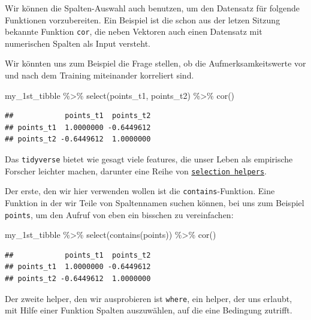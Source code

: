 \documentclass[
]{book}
\newenvironment{Shaded}{\begin{snugshade}}{\end{snugshade}}
\newcommand{\FunctionTok}[1]{\textcolor[rgb]{0.00,0.00,0.00}{#1}}
\newcommand{\NormalTok}[1]{#1}
\newcommand{\SpecialCharTok}[1]{\textcolor[rgb]{0.00,0.00,0.00}{#1}}
\newcommand{\StringTok}[1]{\textcolor[rgb]{0.31,0.60,0.02}{#1}}
\begin{document}
Wir können die Spalten-Auswahl auch benutzen, um den Datensatz für folgende Funktionen vorzubereiten. Ein Beispiel ist die schon aus der letzen Sitzung bekannte Funktion \texttt{cor}, die neben Vektoren auch einen Datensatz mit numerischen Spalten als Input versteht.

Wir könnten uns zum Beispiel die Frage stellen, ob die Aufmerksamkeitswerte vor und nach dem Training miteinander korreliert sind.

\begin{Shaded}
\begin{Highlighting}[]
\NormalTok{my\_1st\_tibble }\SpecialCharTok{\%\textgreater{}\%} 
  \FunctionTok{select}\NormalTok{(points\_t1, points\_t2) }\SpecialCharTok{\%\textgreater{}\%} 
  \FunctionTok{cor}\NormalTok{()}
\end{Highlighting}
\end{Shaded}

\begin{verbatim}
##            points_t1  points_t2
## points_t1  1.0000000 -0.6449612
## points_t2 -0.6449612  1.0000000
\end{verbatim}

Das \texttt{tidyverse} bietet wie gesagt viele features, die unser Leben als empirische Forscher leichter machen, darunter eine Reihe von \href{https://tidyselect.r-lib.org/reference/language.html}{\texttt{selection\ helpers}}.

Der erste, den wir hier verwenden wollen ist die \texttt{contains}-Funktion. Eine Funktion in der wir Teile von Spaltennamen suchen können, bei uns zum Beispiel \texttt{\textquotesingle{}points\textquotesingle{}}, um den Aufruf von eben ein bisschen zu vereinfachen:

\begin{Shaded}
\begin{Highlighting}[]
\NormalTok{my\_1st\_tibble }\SpecialCharTok{\%\textgreater{}\%} 
  \FunctionTok{select}\NormalTok{(}\FunctionTok{contains}\NormalTok{(}\StringTok{\textquotesingle{}points\textquotesingle{}}\NormalTok{)) }\SpecialCharTok{\%\textgreater{}\%} 
  \FunctionTok{cor}\NormalTok{()}
\end{Highlighting}
\end{Shaded}

\begin{verbatim}
##            points_t1  points_t2
## points_t1  1.0000000 -0.6449612
## points_t2 -0.6449612  1.0000000
\end{verbatim}

Der zweite helper, den wir ausprobieren ist \texttt{where}, ein helper, der uns erlaubt, mit Hilfe einer Funktion Spalten auszuwählen, auf die eine Bedingung zutrifft.
\end{document}
